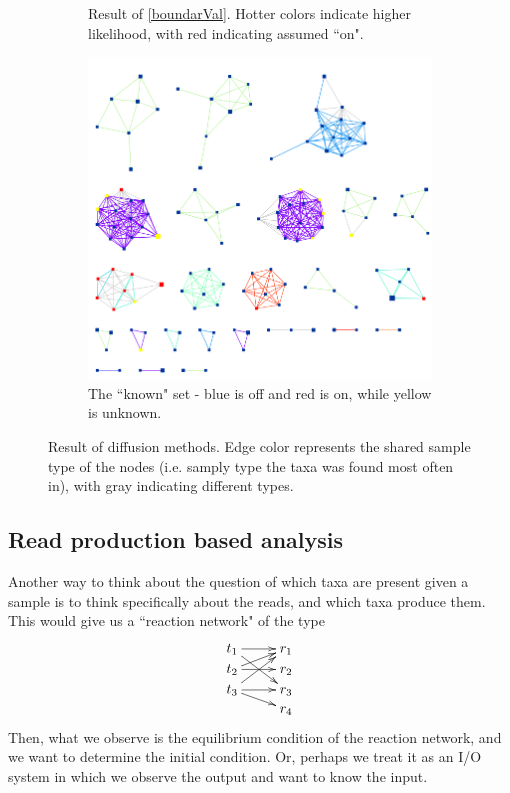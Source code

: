 \documentclass[10pt]{article}
\theoremstyle{definition}
\numberwithin{theorem}{section}
\numberwithin{definition}{section}
\numberwithin{lemma}{section}
\numberwithin{corollary}{section}
\numberwithin{clm}{section}
\numberwithin{rmk}{section}
\begin{document}
\begin{figure}
\begin{center}
\begin{subfigure}[b]{0.48\linewidth}
\begin{center}
	\end{center}
	\caption{Result of \cref{boundarVal}. Hotter colors indicate higher likelihood, with red indicating assumed ``on".}
\end{subfigure}
\begin{subfigure}[b]{0.48\linewidth}
		\begin{center}
		\includegraphics[scale = 0.3]{ranked_known_nodes.png}	
	\end{center}
	\caption{The ``known" set - blue is off and red is on, while yellow is unknown.}
\end{subfigure}
\caption{Result of diffusion methods. Edge color represents the shared sample type of the nodes (i.e. samply type the taxa was found most often in), with gray indicating different types.}\label{diffusion_sample}
\end{center}
\end{figure}	

\subsection{Read production based analysis}
Another way to think about the question of which taxa are present given a sample is to think specifically about the reads, and which taxa produce them. This would give us a ``reaction network" of the type 
\[
\xymatrix@R = 1 pt{
t_1 \ar[r] \ar[ddr] & r_1	\\
t_2 \ar[r] \ar[ur] & r_2\\
t_3 \ar[r] \ar[dr] \ar[uur] & r_3\\
 & r_4}
\]
Then, what we observe is the equilibrium condition of the reaction network, and we want to determine the initial condition. Or, perhaps we treat it as an I/O system in which we observe the output and want to know the input.
\end{document}
